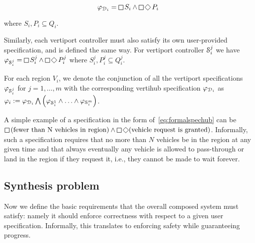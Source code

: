 \begin{equation}\label{eq:formalspechub}
    \varphi_{\design_i} = \LTLglobally S_i \wedge \LTLglobally \LTLfinally P_i
\end{equation}

\noindent where $S_i, P_i \subseteq Q_i$. 

Similarly, each vertiport controller must also satisfy its own user-provided specification, and is defined the same way. For vertiport controller $\mathcal{S}^j_i$ we have $\varphi_{\shield^{j}_i} = \LTLglobally S_{i}^j \wedge \LTLglobally \LTLfinally P_{i}^j$ where $S_{i}^j, P_{i}^j \subseteq Q_i^j$. 

For each region $V_i$, we denote the conjunction of all the vertiport specifications $\varphi_{\mathcal{S}^{j}_i}$ for $j=1,\ldots,m$ with the corresponding vertihub specification $\varphi_{\mathcal{D}_i}$ as $\varphi_i := \varphi_{\mathcal{D}_i} \bigwedge \left( \varphi_{\mathcal{S}^{1}_i} \wedge \ldots \wedge 
\varphi_{\mathcal{S}^{m}_i}\right)$. 

\begin{eg}
A simple example of a specification in the form of~\eqref{eq:formalspechub} can be $\LTLglobally \left(\text{fewer than N vehicles in region} \right) \wedge \LTLglobally\LTLfinally (\text{vehicle request is granted})$. Informally, such a specification requires that no more than $N$ vehicles be in the region at any given time and that always eventually any vehicle is allowed to pass-through or land in the region if they request it, i.e., they cannot be made to wait forever. 
\end{eg}


\subsection{Synthesis problem}\label{sec_correctness}

Now we define the basic  requirements that the overall composed system must satisfy: namely it should enforce correctness with respect to a given user specification.
Informally, this translates to enforcing safety while guaranteeing progress. 


